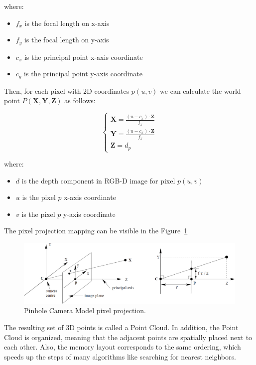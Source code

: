 where:
\begin{itemize}
\item $f_x$ is the focal length on x-axis
\item $f_y$ is the focal length on y-axis
\item $c_x$ is the principal point x-axis coordinate
\item $c_y$ is the principal point y-axis coordinate
\end{itemize}

Then, for each pixel with 2D coordinates $p(u,v)$ we can calculate the world point $P(\mathbf{X},\mathbf{Y},\mathbf{Z})$ as follows:

\begin{equation} \label{equation-world-point-calculation}
    \begin{cases}
        \mathbf{X} = \frac{( u - c_x ) \cdot \mathbf{Z}}{f_x} \\
        \mathbf{Y} = \frac{( u - c_x ) \cdot \mathbf{Z}}{f_x} \\
        \mathbf{Z} = d_p
    \end{cases}
\end{equation}

where:
\begin{itemize}
    \item $d$ is the depth component in RGB-D image for pixel $p(u,v)$
    \item $u$ is the pixel $p$ x-axis coordinate
    \item $v$ is the pixel $p$ y-axis coordinate
\end{itemize}

The pixel projection mapping can be visible in the Figure~\ref{figure:Pinhole-Camera-Model}

\begin{figure}[H]
    \centering
    \includegraphics[width=1.0\textwidth]{images/psd/RGBD/Pinhole-Camera-Model.jpg}
    \caption{Pinhole Camera Model pixel projection. \cite{pinhole-camera-model}}
    \label{figure:Pinhole-Camera-Model}
\end{figure}

The resulting set of 3D points is called a Point Cloud. \cite{point-cloud}
In addition, the Point Cloud is organized,
meaning that the adjacent points are spatially placed next to each other.
Also, the memory layout corresponds to the same ordering,
which speeds up the steps of many algorithms like searching for nearest neighbors.

